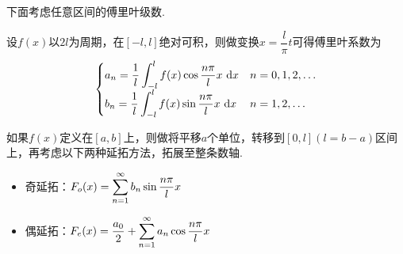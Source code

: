 \par 下面考虑任意区间的傅里叶级数.
\begin{definition}[任意区间的傅里叶级数]
设$f(x)$以$2l$为周期，在$[-l,l]$绝对可积，则做变换$x=\dfrac{l}{\pi}t$可得傅里叶系数为
\[\begin{cases}
a_n=\dfrac{1}{l}\displaystyle\int_{-l}^{l}{f(x)\cos \dfrac{n\pi}{l}x}\,\,\mathrm{d} x & n=0,1,2,\ldots\\
b_n=\dfrac{1}{l}\displaystyle\int_{-l}^{l}{f(x)\sin \dfrac{n\pi}{l}x}\,\,\mathrm{d} x & n=1,2,\ldots
\end{cases}\]
\end{definition}
\par 如果$f(x)$定义在$[a,b]$上，则做将平移$a$个单位，转移到$[0,l](l=b-a)$区间上，再考虑以下两种延拓方法，拓展至整条数轴.
\begin{itemize}
	\item 奇延拓：$F_o(x)=\displaystyle\sum_{n=1}^{\infty}b_n\sin\dfrac{n\pi}{l}x$
	\item 偶延拓：$F_e(x)=\dfrac{a_0}{2}+\displaystyle\sum_{n=1}^{\infty}a_n\cos\dfrac{n\pi}{l}x$
\end{itemize}

